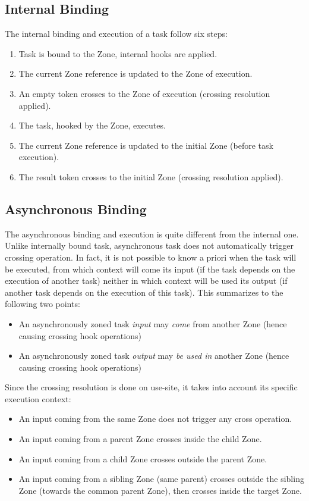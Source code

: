 \subsection*{Internal Binding}

The internal binding and execution of a task follow six steps:
\begin{enumerate}
\item Task is bound to the Zone, internal hooks are applied.
\item The current Zone reference is updated to the Zone of execution.
\item An empty token crosses to the Zone of execution (crossing resolution applied).
\item The task, hooked by the Zone, executes.
\item The current Zone reference is updated to the initial Zone (before task execution).
\item The result token crosses to the initial Zone (crossing resolution applied).
\end{enumerate}

\subsection*{Asynchronous Binding}

The asynchronous binding and execution is quite different from the internal one. Unlike internally bound task, asynchronous task does not automatically trigger crossing operation. In fact, it is not possible to know a priori when the task will be executed, from which context will come its input (if the task depends on the execution of another task) neither in which context will be used its output (if another task depends on the execution of this task). This summarizes to the following two points:
\begin{itemize}
\item An asynchronously zoned task \emph{input} may \emph{come} from another Zone (hence causing crossing hook operations)
\item An asynchronously zoned task \emph{output} may \emph{be used in} another Zone (hence causing crossing hook operations)
\end{itemize}

Since the crossing resolution is done on use-site, it takes into account its specific execution context:
\begin{itemize}
\item An input coming from the same Zone does not trigger any cross operation.
\item An input coming from a parent Zone crosses inside the child Zone.
\item An input coming from a child Zone crosses outside the parent Zone.
\item An input coming from a sibling Zone (same parent) crosses outside the sibling Zone (towards the common parent Zone), then crosses inside the target Zone.
\end{itemize}

